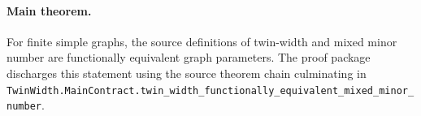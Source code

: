 \paragraph{Main theorem.}
For finite simple graphs, the source definitions of twin-width and mixed minor number are functionally equivalent graph parameters.  The proof package discharges this statement using the source theorem chain culminating in \texttt{TwinWidth.MainContract.twin\_width\_functionally\_equivalent\_mixed\_minor\_number}.
